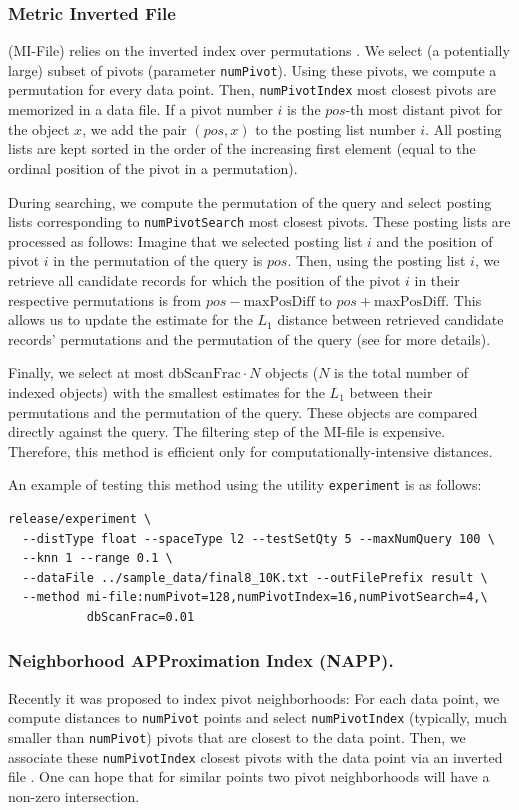 \documentclass[runningheads,a4paper]{llncs}
\newcommand{\ttt}[1]{\texttt{#1}}
\begin{document}
{\subsubsection{Metric Inverted File}
(MI-File) relies on the inverted index over permutations \cite{amato2008approximate}.
We select (a potentially large) subset of pivots (parameter \ttt{numPivot}).
Using these pivots, we compute a permutation for every data point.
Then, \ttt{numPivotIndex} most closest pivots are memorized in a data file. 
If a pivot number $i$ is the \mbox{$pos$-th} most distant pivot for the object $x$,
we add the pair $(pos,x)$ to the posting list number $i$.
All posting lists are kept sorted in the order of the increasing first element 
(equal to the ordinal position of the pivot in a permutation).

During searching, we compute the permutation of the query and select
posting lists corresponding to \ttt{numPivotSearch} most closest pivots.
These posting lists are processed as follows: Imagine that we 
selected posting list $i$ and the position of pivot $i$ in the permutation
of the query is $pos$. Then, 
using the posting list $i$,
we retrieve all candidate records
for which the position of the pivot $i$ in their respective permutations
is from 
$pos - \mbox{maxPosDiff}$ 
to
$pos + \mbox{maxPosDiff}$.
This allows us to update the estimate for the $L_1$ distance between retrieved
candidate records' permutations and the permutation of the query (see \cite{amato2008approximate}
for more details).

Finally, we select at most $\mbox{dbScanFrac} \cdot N$ objects ($N$ is the total
number of indexed objects) with the smallest
estimates for the $L_1$ between their permutations and the permutation of the query.
These objects are compared directly against the query.
The filtering step of the MI-file is expensive. Therefore,
this method is efficient only for computationally-intensive distances.

An example of testing this method using the utility \texttt{experiment} is as follows:
{
\footnotesize
\begin{verbatim}
release/experiment \
  --distType float --spaceType l2 --testSetQty 5 --maxNumQuery 100 \
  --knn 1 --range 0.1 \
  --dataFile ../sample_data/final8_10K.txt --outFilePrefix result \
  --method mi-file:numPivot=128,numPivotIndex=16,numPivotSearch=4,\
           dbScanFrac=0.01
\end{verbatim}
}

\subsubsection{Neighborhood APProximation Index (NAPP).}
Recently it was proposed to index pivot neighborhoods: 
For each data point, we compute distances to \ttt{numPivot} points
and select \ttt{numPivotIndex} (typically, much smaller than \ttt{numPivot}) pivots 
that are closest to the data point.
Then, we associate these \ttt{numPivotIndex} closest pivots with the data point 
via an inverted file \cite{tellez2013succinct}.
One can hope that for similar points two pivot neighborhoods will have a non-zero intersection.

}
\end{document}
